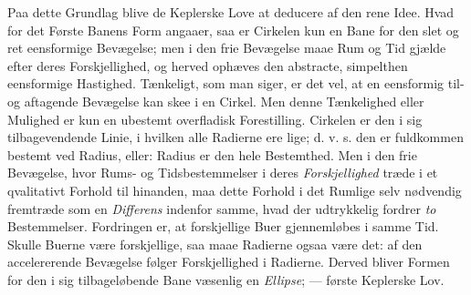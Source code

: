 \documentclass[12pt,a4paper]{book}
\begin{document}
Paa dette Grundlag blive de Keplerske Love at deducere af den rene Idee. Hvad
for det Første Banens Form angaaer, saa er Cirkelen kun en Bane for den slet og
ret eensformige Bevægelse; men i den frie Bevægelse maae Rum og Tid gjælde
efter deres Forskjellighed, og herved ophæves den abstracte, simpelthen
eensformige Hastighed. Tænkeligt, som man siger, er det vel, at en eensformig
til- og aftagende Bevægelse kan skee i en Cirkel. Men denne Tænkelighed eller
Mulighed er kun en ubestemt overfladisk Forestilling. Cirkelen er den i sig
tilbagevendende Linie, i hvilken alle Radierne ere lige; d. v. s. den er
fuldkommen bestemt ved Radius, eller: Radius er den hele Bestemthed.
Men i den frie Bevægelse, hvor Rums- og Tidsbestemmelser i deres
\emph{Forskjellighed} træde i et qvalitativt Forhold til hinanden, maa dette
Forhold i det Rumlige selv nødvendig fremtræde som en \emph{Differens} indenfor
samme, hvad der udtrykkelig fordrer \emph{to} Bestemmelser. Fordringen er, at
forskjellige Buer gjennemløbes i samme Tid. Skulle Buerne være forskjellige,
saa maae Radierne ogsaa være det: af den accelererende Bevægelse følger
Forskjellighed i Radierne. Derved bliver Formen for den i sig tilbageløbende
Bane væsenlig en \emph{Ellipse}; --- første Keplerske Lov.
\end{document}
